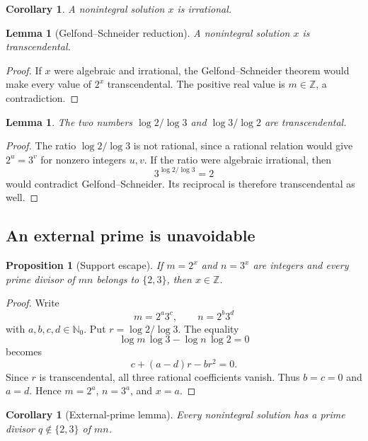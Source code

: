 \documentclass[11pt,oneside]{article}
\newtheorem{proposition}[theorem]{Proposition}
\newtheorem{lemma}[theorem]{Lemma}
\newtheorem{corollary}[theorem]{Corollary}
\theoremstyle{definition}
\newcommand{\N}{\mathbb N}
\newcommand{\Z}{\mathbb Z}
\begin{document}
\begin{corollary}
A nonintegral solution $x$ is irrational.
\end{corollary}

\begin{lemma}[Gelfond--Schneider reduction]
A nonintegral solution $x$ is transcendental.
\end{lemma}

\begin{proof}
If $x$ were algebraic and irrational, the Gelfond--Schneider theorem would make every value of $2^x$ transcendental.  The positive real value is $m\in\Z$, a contradiction.
\end{proof}

\begin{lemma}
The two numbers $\log 2/\log 3$ and $\log 3/\log 2$ are transcendental.
\end{lemma}

\begin{proof}
The ratio $\log 2/\log 3$ is not rational, since a rational relation would give $2^u=3^v$ for nonzero integers $u,v$.  If the ratio were algebraic irrational, then
\[
  3^{\log2/\log3}=2
\]
would contradict Gelfond--Schneider.  Its reciprocal is therefore transcendental as well.
\end{proof}

\subsection{An external prime is unavoidable}

\begin{proposition}[Support escape]
If $m=2^x$ and $n=3^x$ are integers and every prime divisor of $mn$ belongs to $\{2,3\}$, then $x\in\Z$.
\end{proposition}

\begin{proof}
Write
\[
  m=2^a3^c,\qquad n=2^b3^d
\]
with $a,b,c,d\in\N_0$.  Put $r=\log2/\log3$.  The equality
\[
  \log m\,\log3-\log n\,\log2=0
\]
becomes
\[
  c+(a-d)r-br^2=0.
\]
Since $r$ is transcendental, all three rational coefficients vanish.  Thus $b=c=0$ and $a=d$.  Hence $m=2^a$, $n=3^a$, and $x=a$.
\end{proof}

\begin{corollary}[External-prime lemma]
Every nonintegral solution has a prime divisor $q\notin\{2,3\}$ of $mn$.
\end{corollary}
\end{document}
